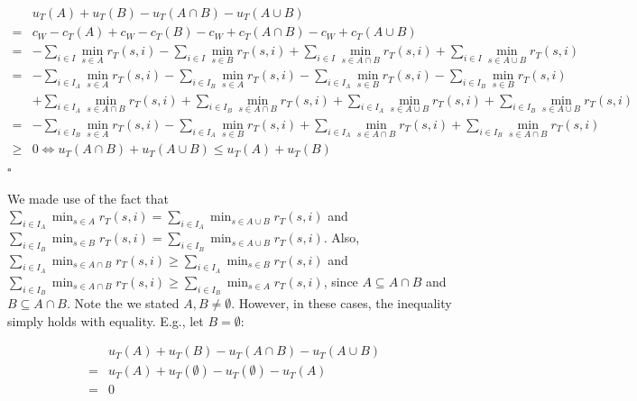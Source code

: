 \documentclass[conference]{IEEEtran}
\begin{document}
\begin{align*}
	& u_{T}(A) + u_{T}(B) - u_{T}(A \cap B) - u_{T}(A \cup B)\\
	= & c_W - c_{T}(A) + c_W - c_{T}(B) - c_W + c_{T}(A \cap B) - c_W + c_{T}(A \cup B)\\
	= & - \sum_{i \in I}{\min_{s \in A}{r_T(s,i)}} - \sum_{i \in I}{\min_{s \in B}{r_T(s,i)}} + \sum_{i \in I}{\min_{s \in A \cap B}{r_T(s,i)}} + \sum_{i \in I}{\min_{s \in A \cup B}{r_T(s,i)}}\\
	= & - \sum_{i \in I_A}{\min_{s \in A}{r_T(s,i)}} - \sum_{i \in I_B}{\min_{s \in A}{r_T(s,i)}} - \sum_{i \in I_A}{\min_{s \in B}{r_T(s,i)}} - \sum_{i \in I_B}{\min_{s \in B}{r_T(s,i)}}\\
	& + \sum_{i \in I_A}{\min_{s \in A \cap B}{r_T(s,i)}} + \sum_{i \in I_B}{\min_{s \in A \cap B}{r_T(s,i)}} + \sum_{i \in I_A}{\min_{s \in A \cup B}{r_T(s,i)}} + \sum_{i \in I_B}{\min_{s \in A \cup B}{r_T(s,i)}}\\
	= & - \sum_{i \in I_B}{\min_{s \in A}{r_T(s,i)}} - \sum_{i \in I_A}{\min_{s \in B}{r_T(s,i)}} + \sum_{i \in I_A}{\min_{s \in A \cap B}{r_T(s,i)}} + \sum_{i \in I_B}{\min_{s \in A \cap B}{r_T(s,i)}}\\
	\geq & 0 \Leftrightarrow u_{T}(A \cap B) + u_{T}(A \cup B) \leq u_{T}(A) + u_{T}(B)
\end{align*}\hfill$\square$

We made use of the fact that $\sum_{i \in I_A}{\min_{s \in A}{r_T(s,i)}} = \sum_{i \in I_A}{\min_{s \in A \cup B}{r_T(s,i)}}$ and $\sum_{i \in I_B}{\min_{s \in B}{r_T(s,i)}} = \sum_{i \in I_B}{\min_{s \in A \cup B}{r_T(s,i)}}$.
Also, $\sum_{i \in I_A}{\min_{s \in A \cap B}{r_T(s,i)}} \geq \sum_{i \in I_A}{\min_{s \in B}{r_T(s,i)}}$ and $\sum_{i \in I_B}{\min_{s \in A \cap B}{r_T(s,i)}} \geq \sum_{i \in I_B}{\min_{s \in A}{r_T(s,i)}}$, since $A \subseteq A \cap B$ and $B \subseteq A \cap B$.
Note the we stated $A,B \neq \emptyset$.
However, in these cases, the inequality simply holds with equality.
E.g., let $B = \emptyset$:

\begin{align*}
	& u_{T}(A) + u_{T}(B) - u_{T}(A \cap B) - u_{T}(A \cup B)\\
	= & u_{T}(A) + u_{T}(\emptyset) - u_{T}(\emptyset) - u_{T}(A)\\
	= & 0
\end{align*}
\end{document}
